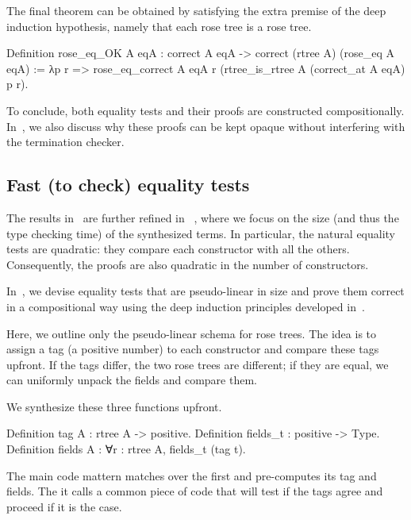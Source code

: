 \documentclass[a4paper, 11pt]{book}
\begin{document}
The final theorem can be obtained by satisfying the extra premise of the deep
induction hypothesis, namely that each rose tree is a rose tree.

\begin{rocqcode}
Definition rose_eq_OK A eqA :
  correct A eqA -> correct (rtree A) (rose_eq A eqA)
:=
  λp r =>
    rose_eq_correct A eqA
      r (rtree_is_rtree A (correct_at A eqA) p r).
\end{rocqcode}


To conclude, both equality tests and their proofs are constructed
compositionally. In~\cite{tassi:hal-01897468}, we also discuss why these proofs
can be kept opaque without interfering with the termination checker.

\subsection{Fast (to check) equality tests}

The results in~\cite{tassi:hal-01897468} are further refined in
~\cite{gregoire:hal-03800154}, where we focus on the size (and thus the type
checking time) of the synthesized terms. In particular, the natural equality
tests are quadratic: they compare each constructor with all the others.
Consequently, the proofs are also quadratic in the number of constructors.

In~\cite{gregoire:hal-03800154}, we devise equality tests that are pseudo-linear
in size and prove them correct in a compositional way using the deep induction
principles developed in~\cite{tassi:hal-01897468}.

Here, we outline only the pseudo-linear schema for rose trees. The idea is to
assign a tag (a positive number) to each constructor and compare these tags
upfront. If the tags differ, the two rose trees are different; if they are
equal, we can uniformly unpack the fields and compare them.

We synthesize these three functions upfront.

\begin{rocqcode}
Definition tag A : rtree A -> positive.
Definition fields_t : positive -> Type.
Definition fields A :  ∀r : rtree A, fields_t (tag t).
\end{rocqcode}

The main code mattern matches over the first  and 
pre-computes its tag and fields. The it calls a common piece of
code  that will test if the tags agree and proceed
if it is the case.
\end{document}
